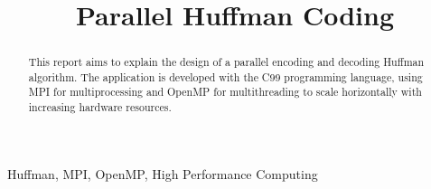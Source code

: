 \documentclass[conference]{IEEEtran}
\begin{document}
\title{Parallel Huffman Coding}

\author{
    \and
}

\maketitle

\thispagestyle{plain}
\pagestyle{plain}

\begin{abstract}
    This report aims to explain the design of a parallel encoding and decoding Huffman algorithm. The application is developed with the C99 programming language, using MPI for multiprocessing and OpenMP for multithreading to scale horizontally with increasing hardware resources. \cite{mapnet}
\end{abstract}

\begin{IEEEkeywords}
    Huffman, MPI, OpenMP, High Performance Computing
\end{IEEEkeywords}




{}

\end{document}
